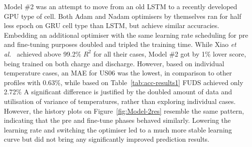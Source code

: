 %
%
Model \#2 was an attempt to move from an old LSTM to a recently developed GPU type of cell.
Both Adam and Nadam optimisers by themselves ran for half less epoch on GRU cell type than LSTM, but achieve similar accuracies.
Embedding an additional optimiser with the same learning rate scheduling for pre and fine-tuning purposes doubled and tripled the training time.
While Xiao \textit{et al.}~\cite{xiao_accurate_2019} achieved above 99.2\% $R^2$ for all their cases, Model \#2 got by 1\% lover score, being trained on both charge and discharge.
However, based on individual temperature cases, an MAE for US06 was the lowest, in comparison to other profiles with 0.63\%, while based on Table~\ref{tab:acc-results1} FUDS achieved only 2.72\%
A significant difference is justified by the doubled amount of data and utilisation of variance of temperatures, rather than exploring individual cases.
However, the history plots on Figure~\ref{fig:Model-2res} resemble the same pattern, indicating that the pre and fine-tune phases behaved similarly.
Lowering the learning rate and switching the optimiser led to a much more stable learning curve but did not bring any significantly improved prediction results.

